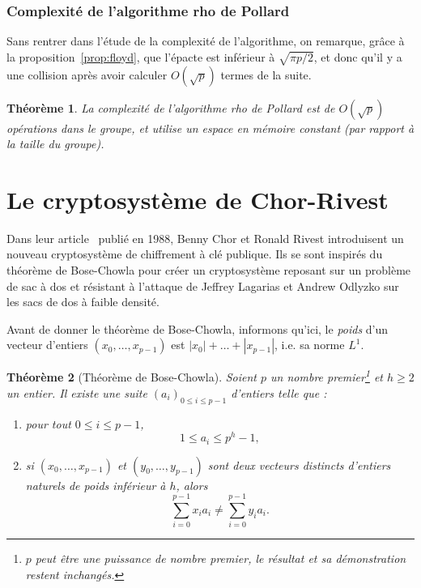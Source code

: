 \documentclass[a4paper, titlepage, 11pt]{article}
\newtheorem{theo}{Théorème}[section]
\theoremstyle{definition}
\theoremstyle{remark}
\def\O{O}
\begin{document}
\subsubsection{Complexité de l'algorithme rho de Pollard}

Sans rentrer dans l'étude de la complexité de l'algorithme, on remarque, grâce à la proposition~\ref{prop:floyd}, que l'épacte est inférieur à $\sqrt{{\pi p}/{2}}$, et donc qu'il y a une collision après avoir calculer $\O(\sqrt p)$ termes de la suite.

\begin{theo}
La complexité de l'algorithme rho de Pollard est de $\O(\sqrt p)$ opérations dans le groupe, et utilise un espace en mémoire constant (par rapport à la taille du groupe).
\end{theo}

\section{Le cryptosystème de Chor-Rivest}\label{sec:cryptosysteme}

Dans leur article~\cite{chorRivest1988} publié en 1988, Benny Chor et Ronald Rivest introduisent un nouveau cryptosystème de chiffrement à clé publique. Ils se sont inspirés du théorème de Bose-Chowla \cite{bose1962} pour créer un cryptosystème reposant sur un problème de sac à dos et résistant à l'attaque de Jeffrey Lagarias et Andrew Odlyzko \cite{lagarias1983} sur les sacs de dos à faible densité.

Avant de donner le théorème de Bose-Chowla, informons qu'ici, le \textit{poids} d'un vecteur d'entiers $(x_0, \dots, x_{p-1})$ est $|x_0| + \dots + |x_{p-1}|$, i.e. sa norme $L^1$.

\begin{theo}[Théorème de Bose-Chowla]
Soient $p$ un nombre premier\footnote{$p$ peut être une puissance de nombre premier, le résultat et sa démonstration restent inchangés.} et $h \geqslant 2$ un entier. Il existe une suite ${(a_i)}_{0\leqslant i \leqslant p-1}$ d'entiers telle que : \begin{enumerate}
\item pour tout $0 \leqslant i \leqslant p-1$, $$1 \leqslant a_i \leqslant p^h-1,$$
\item si $(x_0, \dots, x_{p-1})$ et $(y_0, \dots, y_{p-1})$ sont deux vecteurs distincts d'entiers naturels de poids inférieur à $h$, alors
$$\sum_{i=0}^{p-1} x_ia_i \neq \sum_{i=0}^{p-1} y_ia_i.$$
\end{enumerate}
\end{theo}
\end{document}
